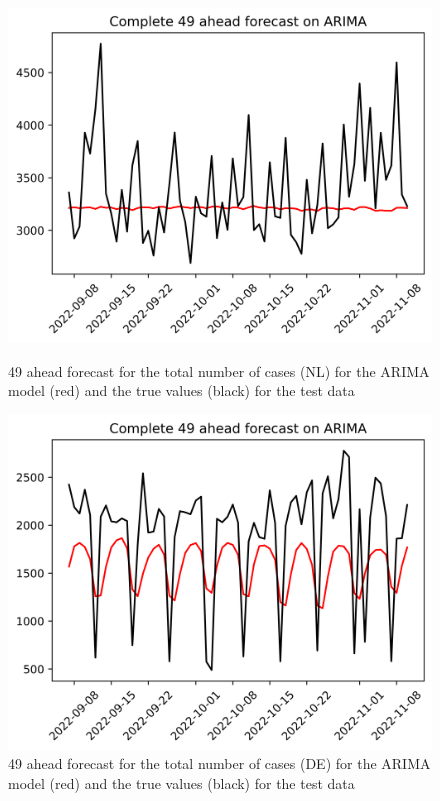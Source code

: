 \begin{figure}

\begin{minipage}{.45\textwidth}
  \centering
  \includegraphics[width=\linewidth]{pics/49_ah/Complete_49_ahead_ARIMA.png}
  \caption{49 ahead forecast for the total number of cases (NL) for the ARIMA model (red) and the true values (black) for the test data}
  \label{fig:tot_cases_fc_49_ARIMA}
\end{minipage}
\begin{minipage}{.45\textwidth}
  \centering
  \includegraphics[width=\linewidth]{pics/49_ah/DE_Complete_49_ahead_ARIMA.png}
  \caption{49 ahead forecast for the total number of cases (DE) for the ARIMA model (red) and the true values (black) for the test data}
  \label{fig:tot_cases_fc_49_ARIMA_DE}
\end{minipage}

\end{figure}
